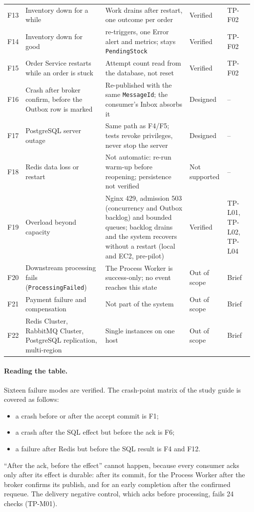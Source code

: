 \documentclass[a4paper]{report}
\begin{document}
\begin{table}[tbp]
\begin{tabular}{@{}>{\raggedright\arraybackslash}p{0.6cm}>{\raggedright\arraybackslash}p{3.7cm}>{\raggedright\arraybackslash}p{4.6cm}>{\raggedright\arraybackslash}p{1.55cm}>{\raggedright\arraybackslash}p{1.6cm}@{}}
F13 & Inventory down for a while & Work drains after restart, one outcome per order & Verified & TP-F02 \\
F14 & Inventory down for good & 3 re-triggers, one Error alert and metrics; stays \texttt{PendingStock} & Verified & TP-F02 \\
F15 & Order Service restarts while an order is stuck & Attempt count read from the database, not reset & Verified & TP-F02 \\
F16 & Crash after broker confirm, before the Outbox row is marked & Re-published with the same \texttt{MessageId}; the consumer's Inbox absorbs it & Designed & -- \\
F17 & PostgreSQL server outage & Same path as F4/F5; tests revoke privileges, never stop the server & Designed & -- \\
F18 & Redis data loss or restart & Not automatic: re-run warm-up before reopening; persistence not verified & Not supported & -- \\
F19 & Overload beyond capacity & Nginx 429, admission 503 (concurrency and Outbox backlog) and bounded queues; backlog drains and the system recovers without a restart (local and EC2, pre-pilot) & Verified & TP-L01, TP-L02, TP-L04 \\
F20 & Downstream processing fails (\texttt{ProcessingFailed}) & The Process Worker is success-only; no event reaches this state & Out of scope & Brief \\
F21 & Payment failure and compensation & Not part of the system & Out of scope & Brief \\
F22 & Redis Cluster, RabbitMQ Cluster, PostgreSQL replication, multi-region & Single instances on one host & Out of scope & Brief \\
\bottomrule
\end{tabular}
\end{table}

\paragraph{Reading the table.} Sixteen failure modes are verified. The
crash-point matrix of the study guide is covered as follows:
\begin{itemize}
  \item a crash before or after the accept commit is F1;
  \item a crash after the SQL effect but before the ack is F6;
  \item a failure after Redis but before the SQL result is F4 and F12.
\end{itemize}
``After the ack, before the effect'' cannot happen, because every consumer
acks only after its effect is durable: after its commit, for the Process
Worker after the broker confirms its publish, and for an early completion
after the confirmed requeue. The delivery negative control, which acks before
processing, fails 24 checks (TP-M01).
\end{document}

